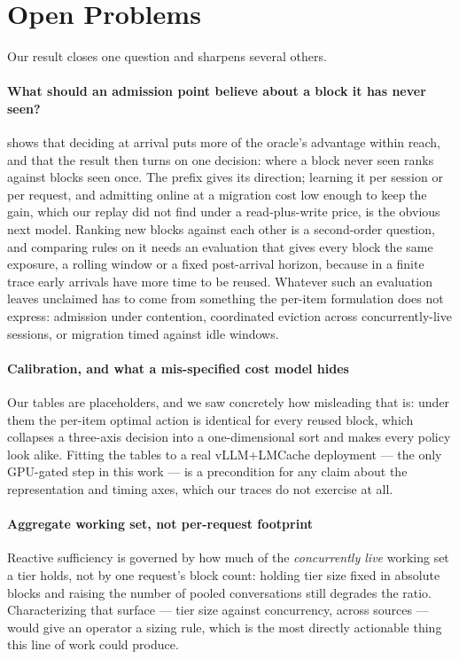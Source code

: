 \section{Open Problems}
\label{sec:open}

Our result closes one question and sharpens several others.

\paragraph{What should an admission point believe about a block it has never seen?}
 shows that deciding at arrival puts more of the oracle's advantage within reach, and
that the result then turns on one decision: where a block never seen ranks against blocks seen once. The
prefix gives its direction; learning it per session or per request, and admitting online at a migration
cost low enough to keep the gain, which our replay did not find under a read-plus-write price, is the
obvious next model. Ranking new blocks against each other is a second-order question, and comparing rules on it needs
an evaluation that gives every block the same exposure, a rolling window or a fixed post-arrival horizon,
because in a finite trace early arrivals have more time to be reused. Whatever such an evaluation leaves
unclaimed has to come from something the per-item formulation does not express: admission under
contention, coordinated eviction across concurrently-live sessions, or migration timed against idle
windows.

\paragraph{Calibration, and what a mis-specified cost model hides}
Our tables are placeholders, and we saw concretely how misleading that is: under them the per-item optimal
action is identical for every reused block, which collapses a three-axis decision into a one-dimensional
sort and makes every policy look alike. Fitting the tables to a real vLLM+LMCache deployment --- the only
GPU-gated step in this work --- is a precondition for any claim about the representation and timing axes,
which our traces do not exercise at all.

\paragraph{Aggregate working set, not per-request footprint}
Reactive sufficiency is governed by how much of the \emph{concurrently live} working set a tier holds, not
by one request's block count: holding tier size fixed in absolute blocks and raising the number of pooled
conversations still degrades the ratio. Characterizing that surface --- tier size against concurrency,
across sources --- would give an operator a sizing rule, which is the most directly actionable thing this
line of work could produce.

